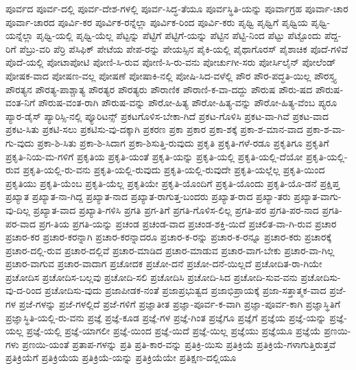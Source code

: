 {ಪೂರ್ವದ
ಪೂರ್ವ-ದಲ್ಲಿ
ಪೂರ್ವ-ದೇಶ-ಗಳಲ್ಲಿ
ಪೂರ್ವ-ಸಿದ್ಧ-ತೆಯೂ
ಪೂರ್ವಸ್ಥಿತಿ-ಯನ್ನು
ಪೂರ್ವಾಗ್ರಹ
ಪೂರ್ವಾ-ಚಾರ
ಪೂರ್ವಾ-ಚಾರದ
ಪೂರ್ವಿ-ಕರ
ಪೂರ್ವಿಕ-ರನ್ನೆಲ್ಲಾ
ಪೂರ್ವಿಕ-ರಿಂದ
ಪೂರ್ವಿ-ಕರು
ಪೃಥ್ವಿ
ಪೃಥ್ವಿಗೆ
ಪೃಥ್ವಿಯ
ಪೃಥ್ವಿ-ಯನ್ನೆಲ್ಲಾ
ಪೃಥ್ವಿ-ಯಲ್ಲಿ
ಪೃಥ್ವಿ-ಯೆಲ್ಲ
ಪೆಟ್ಟನ್ನು
ಪೆಟ್ಟಿಗೆ
ಪೆಟ್ಟಿಗೆ-ಯನ್ನು
ಪೆಟ್ಟಿನ
ಪೆಟ್ಟಿ-ನಿಂದ
ಪೆಟ್ಟು
ಪೆಟ್ಟೊಂದು
ಪೆದ್ದ-ರಿಗೆ
ಪೆಬ್ರು-ವರಿ
ಪೆರ್ರಿ
ಪೆಸಿಫಿಕ್
ಪೇಟೆಯ
ಪೇಪ-ರನ್ನು
ಪೇಯಸ್ಸಿನ
ಪೈಕಿ-ಯಲ್ಲಿ
ಪೈಥಾಗೊರಸ್
ಪೈಶಾಚಿಕ
ಪೊದೆ-ಗಳಿವೆ
ಪೊದೆ-ಯಲ್ಲಿ
ಪೋಟಾಪೋಟಿ
ಪೋಣಿ-ಸಿ-ರುವ
ಪೋಣಿ-ಸಿ-ರು-ವನು
ಪೋರ್ಚುಗೀ-ಸರು
ಪೋರ್ಸಿಲೈನ್
ಪೋಲೆಂಡ್
ಪೋಷಕ-ವಾದ
ಪೋಷಣ-ವಲ್ಲ
ಪೋಷಣೆ
ಪೋಷಾಕಿ-ನಲ್ಲಿ
ಪೋಷಿ-ಸಿದ-ವಳೆಲ್ಲಿ
ಪೌರ
ಪೌರ-ಪದ್ಧತಿ-ಯಿಲ್ಲ
ಪೌರಸ್ತ್ಯ
ಪೌರತ್ಯನ
ಪೌರತ್ಯ-ಪಾಶ್ಚಾತ್ಯ
ಪೌರತ್ಯರ
ಪೌರತ್ಯರು
ಪೌರಾಣಿಕ
ಪೌರಾಣಿ-ಕ-ವಾ-ದದ್ದು
ಪೌರುಷ
ಪೌರು-ಷದ
ಪೌರುಷ-ವಂತ-ನಿಗೆ
ಪೌರುಷ-ವಂತ-ರಾಗಿ
ಪೌರುಷ-ವನ್ನು
ಪೌರೋ-ಹಿತ್ಯ
ಪೌರೋ-ಹಿತ್ಯ-ವನ್ನು
ಪೌರೋ-ಹಿತ್ಯ-ವೆಂಬ
ಪ್ಯರೂ
ಪ್ಯಾರ-ಡೈಸ್
ಪ್ಯಾರಿಸ್ಸಿ-ನಲ್ಲಿ
ಪ್ಯೂರಿಟನ್ಸ್
ಪ್ರಕಟಗೊಳಿಸ-ಬೇಕಾ-ಗಿದೆ
ಪ್ರಕಟ-ಗೊಳಿಸಿ
ಪ್ರಕಟ-ವಾ-ಗಿವೆ
ಪ್ರಕಟ-ವಾದ
ಪ್ರಕಟ-ಸಿತು
ಪ್ರಕಟಿ-ಸಲು
ಪ್ರಕಟಿಸು-ವು-ದಕ್ಕಾಗಿ
ಪ್ರಕರಣ
ಪ್ರಕಾ
ಪ್ರಕಾರ
ಪ್ರಕಾ-ಶಕ್ಕೆ
ಪ್ರಕಾ-ಶ-ಮಾನ-ವಾದ
ಪ್ರಕಾ-ಶ-ವಾ-ಗು-ವುದು
ಪ್ರಕಾ-ಶಿ-ಸಿತು
ಪ್ರಕಾ-ಶಿ-ಸಿದಾಗ
ಪ್ರಕಾ-ಶಿಸುತ್ತಿ-ರುವುದು
ಪ್ರಕೃತಿ
ಪ್ರಕೃತಿ-ಗಳೆ-ರಡೂ
ಪ್ರಕೃತಿಗೂ
ಪ್ರಕೃತಿಗೆ
ಪ್ರಕೃತಿ-ನಿಯ-ಮ-ಗಳಿಗೆ
ಪ್ರಕೃತಿಯ
ಪ್ರಕೃತಿ-ಯಂತೆ
ಪ್ರಕೃತಿ-ಯನ್ನು
ಪ್ರಕೃತಿ-ಯಲ್ಲಿ
ಪ್ರಕೃತಿ-ಯಲ್ಲಿ-ದೆಯೋ
ಪ್ರಕೃತಿ-ಯಲ್ಲಿ-ರುವ
ಪ್ರಕೃತಿ-ಯಲ್ಲಿ-ರು-ವನು
ಪ್ರಕೃತಿ-ಯಲ್ಲಿ-ರುವುದು
ಪ್ರಕೃತಿ-ಯಲ್ಲಿ-ರುವುದೇ
ಪ್ರಕೃತಿ-ಯಲ್ಲೆಲ್ಲ
ಪ್ರಕೃತಿ-ಯಿಂದ
ಪ್ರಕೃತಿಯು
ಪ್ರಕೃತಿ-ಯೆಂಬ
ಪ್ರಕೃತಿ-ಯೆಲ್ಲ
ಪ್ರಕೃತಿಯೇ
ಪ್ರಕೃತಿ-ಯೊಂದಿಗೆ
ಪ್ರಕೃತಿ-ಯೊಂದು
ಪ್ರಕೃತಿ-ಯೊ-ಡನೆ
ಪ್ರಕ್ಷಿಪ್ತ
ಪ್ರಖ್ಯಾತ
ಪ್ರಖ್ಯಾತ-ನಾ-ಗಿದ್ದ
ಪ್ರಖ್ಯಾತ-ನಾದ
ಪ್ರಖ್ಯಾತ-ರಾಗುತ್ತ-ಬಂದರು
ಪ್ರಖ್ಯಾತ-ರಾದ
ಪ್ರಖ್ಯಾ-ತರು
ಪ್ರಖ್ಯಾತ-ವಾಗು-ವು-ದಿಲ್ಲ
ಪ್ರಖ್ಯಾತ-ವಾದ
ಪ್ರಖ್ಯಾತಿ-ಗಳಿಸಿ
ಪ್ರಗತಿ
ಪ್ರಗ-ತಿಗೆ
ಪ್ರಗತಿ-ಗೊಳಿಸ-ಲಿಲ್ಲ
ಪ್ರಗತಿ-ಪರ
ಪ್ರಗತಿ-ಪರ-ನಾದ
ಪ್ರಗತಿ-ಪರ-ವಾದ
ಪ್ರಗ-ತಿಯ
ಪ್ರಗತಿ-ಯನ್ನು
ಪ್ರಚಂಡ
ಪ್ರಚಂಡ-ವಾದ
ಪ್ರಚಂಡ-ಶಕ್ತಿ-ಯಿದೆ
ಪ್ರಚಲಿತ-ವಾ-ಗಿ-ರುವ
ಪ್ರಚಾರ
ಪ್ರಚಾರ-ಕರ
ಪ್ರಚಾರ-ಕರನ್ನಾಗಿ
ಪ್ರಚಾರ-ಕರನ್ನಾದರೂ
ಪ್ರಚಾರ-ಕ-ರನ್ನು
ಪ್ರಚಾರ-ಕ-ರನ್ನೂ
ಪ್ರಚಾರ-ಕರು
ಪ್ರಚಾರಕ್ಕೆ
ಪ್ರಚಾರ-ದಲ್ಲಿ-ರುವ
ಪ್ರಚಾರ-ದಲ್ಲಿವೆ
ಪ್ರಚಾರ-ಮಾಡಿದ
ಪ್ರಚಾರ-ಮಾಡುವ
ಪ್ರಚಾರ-ವಾಗ-ಬೇಕು
ಪ್ರಚಾರ-ವಾ-ಗಿಲ್ಲ
ಪ್ರಚಾರ-ವಾಗುವ
ಪ್ರಚಾರ-ವಾದಾಗ
ಪ್ರಚೋದಕ
ಪ್ರಚೋ-ದನೆ
ಪ್ರಚೋ-ದನೆ-ಯಿಲ್ಲದೆ
ಪ್ರಚೋದಿತ-ರಾ-ಗಿಯೇ
ಪ್ರಚೋದಿಸ
ಪ್ರಚೋದಿಸ-ಬಲ್ಲವು
ಪ್ರಚೋದಿ-ಸಲಿ
ಪ್ರಚೋದಿಸಿ
ಪ್ರಚೋದಿ-ಸಿದ
ಪ್ರಚೋದಿ-ಸುವ-ವನು
ಪ್ರಚೋದಿಸು-ವು-ದ-ರಿಂದ
ಪ್ರಚೋದಿಸು-ವುದು
ಪ್ರಜಾಪೀಡಕ-ನಂತೆ
ಪ್ರಜಾಪ್ರಭುತ್ವದ
ಪ್ರಜಾಭಿಪ್ರಾಯಕ್ಕೆ
ಪ್ರಜಾ-ಸತ್ತಾತ್ಮಕ-ವಾದ
ಪ್ರಜೆ-ಗಳ
ಪ್ರಜೆ-ಗಳನ್ನು
ಪ್ರಜೆ-ಗಳಲ್ಲಿದೆ
ಪ್ರಜೆ-ಗಳಿಗೆ
ಪ್ರಜ್ಞಾತೀತ
ಪ್ರಜ್ಞಾ-ಪೂರ್ವ-ಕ-ವಾಗಿ
ಪ್ರಜ್ಞಾ-ಪೂರ್ವ-ಕಾಗಿ
ಪ್ರಜ್ಞಾಸ್ಥಿತಿಗೆ
ಪ್ರಜ್ಞಾಸ್ಥಿತಿ-ಯಲ್ಲಿ-ರು-ವನು
ಪ್ರಜ್ಞೆ
ಪ್ರಜ್ಞೆ-ಕೂಡ
ಪ್ರಜ್ಞೆ-ಗಳ
ಪ್ರಜ್ಞೆ-ಗಿಂತ
ಪ್ರಜ್ಞೆಗೂ
ಪ್ರಜ್ಞೆಗೆ
ಪ್ರಜ್ಞೆಯ
ಪ್ರಜ್ಞೆ-ಯನ್ನು
ಪ್ರಜ್ಞೆ-ಯಲ್ಲ
ಪ್ರಜ್ಞೆ-ಯಲ್ಲಿ
ಪ್ರಜ್ಞೆ-ಯಾಗಲೀ
ಪ್ರಜ್ಞೆ-ಯಿಂದ
ಪ್ರಜ್ಞೆ-ಯಿದೆ
ಪ್ರಜ್ಞೆ-ಯಿಲ್ಲ
ಪ್ರಜ್ಞೆಯು
ಪ್ರಜ್ಞೆಯೂ
ಪ್ರಜ್ಞೆಯೆ
ಪ್ರಣಯಿ-ಗಳು
ಪ್ರಣಯಿ-ಯಂತೆ
ಪ್ರತಾಪ-ಗಳನ್ನು
ಪ್ರತಿ
ಪ್ರತಿ-ಕಾರ-ವನ್ನು
ಪ್ರತಿಕ್ರಿ-ಯಿಸು
ಪ್ರತಿಕ್ರಿಯೆ
ಪ್ರತಿಕ್ರಿಯೆ-ಗಳಾಗುತ್ತಿರುತ್ತವೆ
ಪ್ರತಿಕ್ರಿಯೆಗೆ
ಪ್ರತಿಕ್ರಿಯೆಯ
ಪ್ರತಿಕ್ರಿಯೆ-ಯನ್ನು
ಪ್ರತಿಕ್ರಿಯೆಯೇ
ಪ್ರತಿಕ್ಷಣ-ದಲ್ಲಿಯೂ
}
